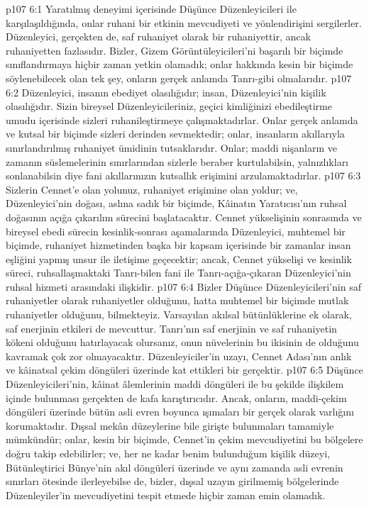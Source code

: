 \vs p107 6:1 Yaratılmış deneyimi içerisinde Düşünce Düzenleyicileri ile karşılaşıldığında, onlar ruhani bir etkinin mevcudiyeti ve yönlendirişini sergilerler. Düzenleyici, gerçekten de, saf ruhaniyet olarak bir ruhaniyettir, ancak ruhaniyetten fazlasıdır. Bizler, Gizem Görüntüleyicileri’ni başarılı bir biçimde sınıflandırmaya hiçbir zaman yetkin olamadık; onlar hakkında kesin bir biçimde söylenebilecek olan tek şey, onların gerçek anlamda Tanrı\hyp{}gibi olmalarıdır.
\vs p107 6:2 Düzenleyici, insanın ebediyet olasılığıdır; insan, Düzenleyici’nin kişilik olasılığıdır. Sizin bireysel Düzenleyicileriniz, geçici kimliğinizi ebedileştirme umudu içerisinde sizleri ruhanileştirmeye çalışmaktadırlar. Onlar gerçek anlamda ve kutsal bir biçimde sizleri derinden sevmektedir; onlar, insanların akıllarıyla sınırlandırılmış ruhaniyet ümidinin tutsaklarıdır. Onlar; maddi nişanların ve zamanın süslemelerinin sınırlarından sizlerle beraber kurtulabilsin, yalnızlıkları sonlanabilsin diye fani akıllarınızın kutsallık erişimini arzulamaktadırlar.
\vs p107 6:3 Sizlerin Cennet’e olan yolunuz, ruhaniyet erişimine olan yoldur; ve, Düzenleyici’nin doğası, aslına sadık bir biçimde, Kâinatın Yaratıcısı’nın ruhsal doğasının açığa çıkarılım sürecini başlatacaktır. Cennet yükselişinin sonrasında ve bireysel ebedi sürecin kesinlik\hyp{}sonrası aşamalarında Düzenleyici, muhtemel bir biçimde, ruhaniyet hizmetinden başka bir kapsam içerisinde bir zamanlar insan eşliğini yapmış unsur ile iletişime geçecektir; ancak, Cennet yükselişi ve kesinlik süreci, ruhsallaşmaktaki Tanrı\hyp{}bilen fani ile Tanrı\hyp{}açığa\hyp{}çıkaran Düzenleyici’nin ruhsal hizmeti arasındaki ilişkidir.
\vs p107 6:4 Bizler Düşünce Düzenleyicileri’nin saf ruhaniyetler olarak ruhaniyetler olduğunu, hatta muhtemel bir biçimde mutlak ruhaniyetler olduğunu, bilmekteyiz. Varsayılan akılsal bütünlüklerine ek olarak, saf enerjinin etkileri de mevcuttur. Tanrı’nın saf enerjinin ve saf ruhaniyetin kökeni olduğunu hatırlayacak olursanız, onun nüvelerinin bu ikisinin de olduğunu kavramak çok zor olmayacaktır. Düzenleyiciler’in uzayı, Cennet Adası’nın anlık ve kâinatsal çekim döngüleri üzerinde kat ettikleri bir gerçektir.
\vs p107 6:5 Düşünce Düzenleyicileri’nin, kâinat âlemlerinin maddi döngüleri ile bu şekilde ilişkilem içinde bulunması gerçekten de kafa karıştırıcıdır. Ancak, onların, maddi\hyp{}çekim döngüleri üzerinde bütün asli evren boyunca ışımaları bir gerçek olarak varlığını korumaktadır. Dışsal mekân düzeylerine bile girişte bulunmaları tamamiyle mümkündür; onlar, kesin bir biçimde, Cennet’in çekim mevcudiyetini bu bölgelere doğru takip edebilirler; ve, her ne kadar benim bulunduğum kişilik düzeyi, Bütünleştirici Bünye’nin akıl döngüleri üzerinde ve aynı zamanda asli evrenin sınırları ötesinde ilerleyebilse de, bizler, dışsal uzayın girilmemiş bölgelerinde Düzenleyiler’in mevcudiyetini tespit etmede hiçbir zaman emin olamadık.
